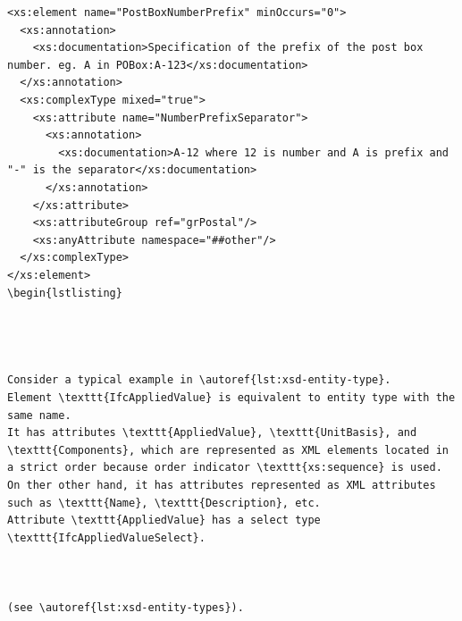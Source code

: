 \begin{lstlisting}[caption={a},label=lst:xsd-entity-type-mixed-element]
<xs:element name="PostBoxNumberPrefix" minOccurs="0">
  <xs:annotation>
    <xs:documentation>Specification of the prefix of the post box number. eg. A in POBox:A-123</xs:documentation>
  </xs:annotation>
  <xs:complexType mixed="true">
    <xs:attribute name="NumberPrefixSeparator">
      <xs:annotation>
        <xs:documentation>A-12 where 12 is number and A is prefix and "-" is the separator</xs:documentation>
      </xs:annotation>
    </xs:attribute>
    <xs:attributeGroup ref="grPostal"/>
    <xs:anyAttribute namespace="##other"/>
  </xs:complexType>
</xs:element>
\begin{lstlisting}




Consider a typical example in \autoref{lst:xsd-entity-type}.
Element \texttt{IfcAppliedValue} is equivalent to entity type with the same name.
It has attributes \texttt{AppliedValue}, \texttt{UnitBasis}, and \texttt{Components}, which are represented as XML elements located in a strict order because order indicator \texttt{xs:sequence} is used.
On ther other hand, it has attributes represented as XML attributes such as \texttt{Name}, \texttt{Description}, etc.
Attribute \texttt{AppliedValue} has a select type \texttt{IfcAppliedValueSelect}.



(see \autoref{lst:xsd-entity-types}).






\end{lstlisting}
